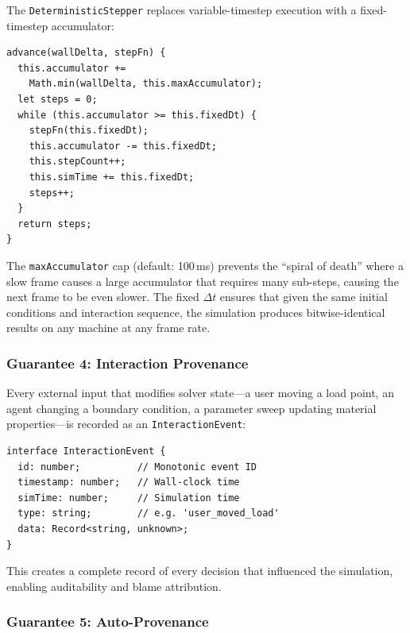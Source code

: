 \documentclass[letterpaper,twocolumn,10pt]{article}
\begin{document}
The \texttt{DeterministicStepper} replaces variable-timestep execution
with a fixed-timestep accumulator:

\begin{lstlisting}[caption={Fixed-timestep accumulator. The solver always receives the same $\Delta t$, regardless of frame rate.}, label={lst:stepper}]
advance(wallDelta, stepFn) {
  this.accumulator +=
    Math.min(wallDelta, this.maxAccumulator);
  let steps = 0;
  while (this.accumulator >= this.fixedDt) {
    stepFn(this.fixedDt);
    this.accumulator -= this.fixedDt;
    this.stepCount++;
    this.simTime += this.fixedDt;
    steps++;
  }
  return steps;
}
\end{lstlisting}

The \texttt{maxAccumulator} cap (default: 100\,ms) prevents the
``spiral of death'' where a slow frame causes a large accumulator
that requires many sub-steps, causing the next frame to be even slower.
The fixed $\Delta t$ ensures that given the same initial conditions
and interaction sequence, the simulation produces bitwise-identical
results on any machine at any frame rate.

\subsubsection{Guarantee 4: Interaction Provenance}

Every external input that modifies solver state---a user moving a load
point, an agent changing a boundary condition, a parameter sweep
updating material properties---is recorded as an \texttt{InteractionEvent}:

\begin{lstlisting}[caption={Interaction provenance. Every external input is recorded with simulation time, wall-clock time, and monotonic event ID.}]
interface InteractionEvent {
  id: number;          // Monotonic event ID
  timestamp: number;   // Wall-clock time
  simTime: number;     // Simulation time
  type: string;        // e.g. 'user_moved_load'
  data: Record<string, unknown>;
}
\end{lstlisting}

This creates a complete record of every decision that influenced the
simulation, enabling auditability and blame attribution.

\subsubsection{Guarantee 5: Auto-Provenance}
\end{document}
